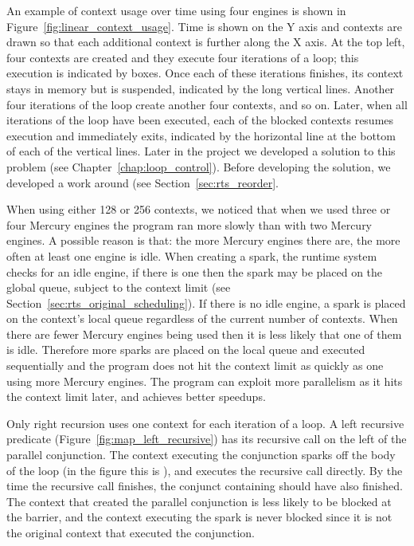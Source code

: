
An example of context usage over time using four engines is shown in
Figure~\ref{fig:linear_context_usage}.
Time is shown on the Y axis and contexts are drawn so that each additional
context is further along the X axis.
At the top left,
four contexts are created and they execute four iterations of a loop;
this execution is indicated by boxes.
Once each of these iterations finishes,
its context stays in memory but is suspended,
indicated by the long vertical lines.
Another four iterations of the loop create another four contexts, and so on.
Later, when all iterations of the loop have been executed,
each of the blocked contexts resumes execution and immediately exits,
indicated by the horizontal line at the bottom of each of the vertical
lines.
Later in the project we developed a solution to this problem
(see Chapter~\ref{chap:loop_control}).
Before developing the solution, we developed a work around
(see Section~\ref{sec:rts_reorder}.

When using either 128 or 256 contexts,
we noticed that when we used three or four Mercury engines
the program ran more slowly than with two Mercury engines.
A possible reason is that:
the more Mercury engines there are, the more often at least one engine is
idle.
When creating a spark, the runtime system checks for an idle engine,
if there is one then the spark may be placed on the global queue, subject to
    the context limit (see Section~\ref{sec:rts_original_scheduling}).
If there is no idle engine,
a spark is placed on the context's local queue regardless of the current
number of contexts.
When there are fewer Mercury engines being used then it is less likely that
one of them is idle.
Therefore more sparks are placed on the local queue and executed
sequentially and the program does not hit the context limit as quickly as
one using more Mercury engines.
The program can exploit more parallelism as it hits the context limit
later,
and achieves better speedups.

Only right recursion uses one context for each iteration of a loop. 
A left recursive predicate (Figure~\ref{fig:map_left_recursive}) has its
recursive call on the left of the parallel conjunction.
The context executing the conjunction sparks off the body of the loop
(in the figure this is ),
and executes the recursive call directly.
By the time the recursive call finishes,
the conjunct containing  should have also finished.
The context that created the parallel conjunction is less likely to be
blocked at the barrier,
and the context executing the spark is never blocked since it is not the
original context that executed the conjunction.

